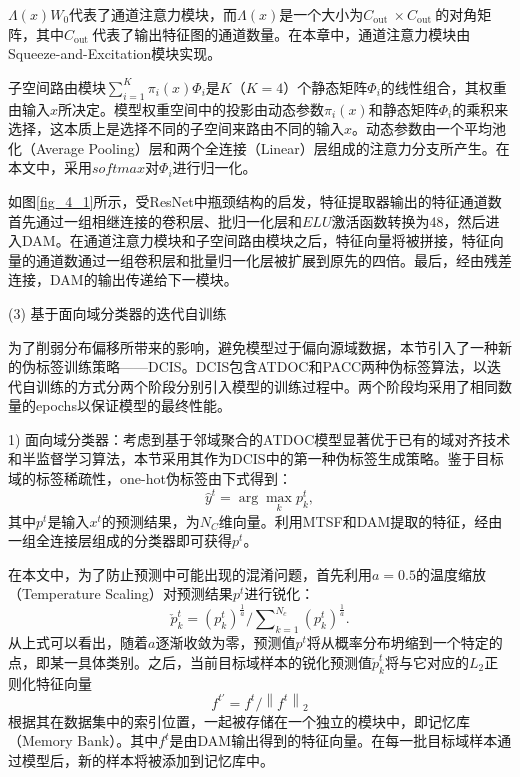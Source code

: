 ${\Lambda}({x}) {W}_{0}$代表了通道注意力模块，而${\Lambda}({x})$是一个大小为$C_{\text {out }} \times C_{\text {out }}$的对角矩阵，其中$C_{\text {out }}$代表了输出特征图的通道数量。在本章中，通道注意力模块由Squeeze-and-Excitation模块实现\cite{4-4}。

子空间路由模块$\sum_{i=1}^{K} \pi_{i}(x){\Phi}_{i}$是$K$（$K=4$）个静态矩阵${\Phi}_{i}$的线性组合，其权重由输入$x$所决定。模型权重空间中的投影由动态参数$\pi_{i}(x)$和静态矩阵${\Phi}_{i}$的乘积来选择，这本质上是选择不同的子空间来路由不同的输入$x$。动态参数由一个平均池化（Average Pooling）层和两个全连接（Linear）层组成的注意力分支所产生。在本文中，采用$softmax$对${\Phi}_{i}$进行归一化。

如图\ref{fig_4_1}所示，受ResNet中瓶颈结构的启发，特征提取器输出的特征通道数首先通过一组相继连接的卷积层、批归一化层和$ELU$激活函数转换为48，然后进入DAM。在通道注意力模块和子空间路由模块之后，特征向量将被拼接，特征向量的通道数通过一组卷积层和批量归一化层被扩展到原先的四倍。最后，经由残差连接，DAM的输出传递给下一模块。

(3) 基于面向域分类器的迭代自训练

为了削弱分布偏移所带来的影响，避免模型过于偏向源域数据，本节引入了一种新的伪标签训练策略——DCIS。DCIS包含ATDOC和PACC两种伪标签算法，以迭代自训练的方式分两个阶段分别引入模型的训练过程中。两个阶段均采用了相同数量的epochs以保证模型的最终性能。

1) 面向域分类器：考虑到基于邻域聚合的ATDOC模型显著优于已有的域对齐技术和半监督学习算法\cite{4-5}，本节采用其作为DCIS中的第一种伪标签生成策略。鉴于目标域的标签稀疏性，one-hot伪标签由下式得到\cite{4-6}：
\begin{equation}
\label{deqn_ex3}
\hat{y}^{t}=\arg \max _{k} p_{k}^{t},
\end{equation}
其中$p^{t}$是输入$x^{t}$的预测结果，为$N_{C}$维向量。利用MTSF和DAM提取的特征，经由一组全连接层组成的分类器即可获得$p^{t}$。

在本文中，为了防止预测中可能出现的混淆问题，首先利用$a=0.5$的温度缩放（Temperature Scaling）\cite{4-7}对预测结果$p^{t}$进行锐化：
\begin{equation}
\label{deqn_ex4}
{\check{p}_{k}^{t}}=(p_{k}^{t})_{{}}^{\frac{1}{a}}/\sum\nolimits_{k=1}^{{{N}_{c}}}{(p_{k}^{t})_{{}}^{\frac{1}{a}}}.
\end{equation}
从上式可以看出，随着$a$逐渐收敛为零，预测值$p^{t}$将从概率分布坍缩到一个特定的点，即某一具体类别。之后，当前目标域样本的锐化预测值${\check{p}_{k}^{t}}$将与它对应的$L_{2}$正则化特征向量
\begin{equation}
\label{deqn_ex5}
f^{t'}=f^{t} /\left\|f^{t}\right\|_{2}
\end{equation}
根据其在数据集中的索引位置，一起被存储在一个独立的模块中，即记忆库（Memory Bank）。其中$f^{t}$是由DAM输出得到的特征向量。在每一批目标域样本通过模型后，新的样本将被添加到记忆库中。

